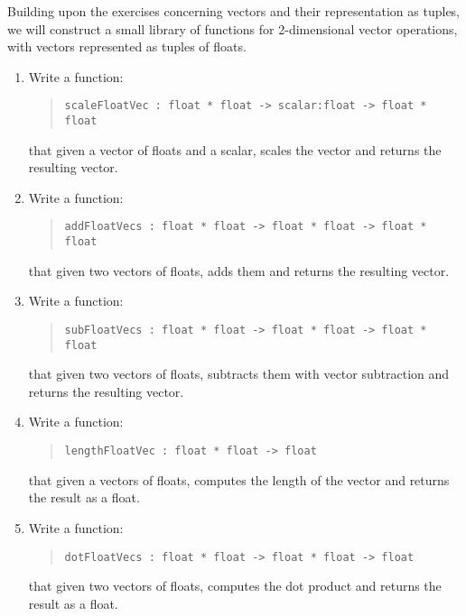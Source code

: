 Building upon the exercises concerning vectors and their representation as tuples, we will construct a small library of functions for 2-dimensional vector operations, with vectors represented as tuples of floats.

\begin{enumerate}
\item Write a function:
  \begin{quote}
    \mbox{\lstinline!scaleFloatVec : float * float -> scalar:float -> float * float!}
  \end{quote}
  that given a vector of floats and a scalar, scales the vector and returns the resulting vector.

\item Write a function:
  \begin{quote}
    \mbox{\lstinline!addFloatVecs : float * float -> float * float -> float * float!}
  \end{quote}
  that given two vectors of floats, adds them and returns the resulting vector.

\item Write a function:
  \begin{quote}
    \mbox{\lstinline!subFloatVecs : float * float -> float * float -> float * float!}
  \end{quote}
  that given two vectors of floats, subtracts them with vector subtraction and returns the resulting vector.

\item Write a function:
  \begin{quote}
    \mbox{\lstinline!lengthFloatVec : float * float -> float!}
  \end{quote}
  that given a vectors of floats, computes the length of the vector and returns the result as a float.

\item Write a function:
  \begin{quote}
    \mbox{\lstinline!dotFloatVecs : float * float -> float * float -> float!}
  \end{quote}
  that given two vectors of floats, computes the dot product and returns the result as a float.
  
\end{enumerate}
